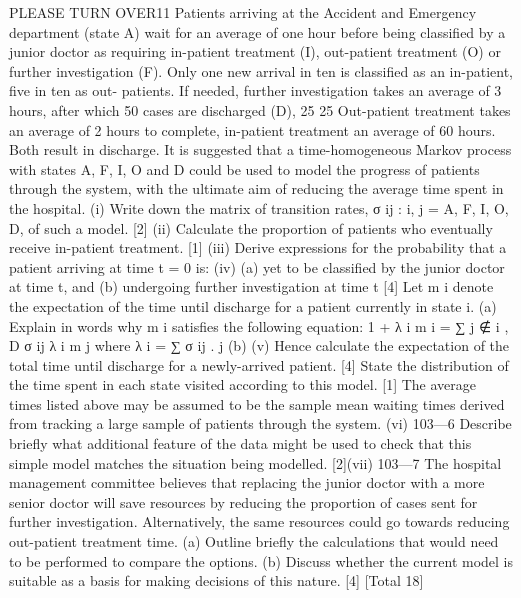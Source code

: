 \documentclass[a4paper,12pt]{article}
\begin{document}
PLEASE TURN OVER11
Patients arriving at the Accident and Emergency department (state A) wait for
an average of one hour before being classified by a junior doctor as requiring
in-patient treatment (I), out-patient treatment (O) or further investigation (F).
Only one new arrival in ten is classified as an in-patient, five in ten as out-
patients.
If needed, further investigation takes an average of 3 hours, after which 50%
cases are discharged (D), 25%
25%
Out-patient treatment takes an average of 2 hours to complete, in-patient
treatment an average of 60 hours. Both result in discharge.
It is suggested that a time-homogeneous Markov process with states A, F, I, O
and D could be used to model the progress of patients through the system,
with the ultimate aim of reducing the average time spent in the hospital.
(i) Write down the matrix of transition rates, {σ ij : i, j = A, F, I, O, D}, of
such a model.
[2]
(ii) Calculate the proportion of patients who eventually receive in-patient
treatment.
[1]
(iii) Derive expressions for the probability that a patient arriving at time
t = 0 is:
(iv)
(a) yet to be classified by the junior doctor at time t, and
(b) undergoing further investigation at time t
[4]
Let m i denote the expectation of the time until discharge for a patient
currently in state i.
(a)
Explain in words why m i satisfies the following equation:
1
+
λ i
m i =
∑
j ∉ { i , D }
σ ij
λ i
m j
where λ i = ∑ σ ij .
j
(b)
(v)
Hence calculate the expectation of the total time until discharge for a newly-arrived patient.
[4]
State the distribution of the time spent in each state visited according to this model.
[1]
The average times listed above may be assumed to be the sample mean waiting times derived from tracking a large sample of patients through the system.
(vi)
103—6
Describe briefly what additional feature of the data might be used to
check that this simple model matches the situation being modelled. [2](vii)
103—7
The hospital management committee believes that replacing the junior
doctor with a more senior doctor will save resources by reducing the
proportion of cases sent for further investigation. Alternatively, the
same resources could go towards reducing out-patient treatment time.
(a) Outline briefly the calculations that would need to be performed
to compare the options.
(b) Discuss whether the current model is suitable as a basis for
making decisions of this nature.
[4]
[Total 18]
\end{document}

